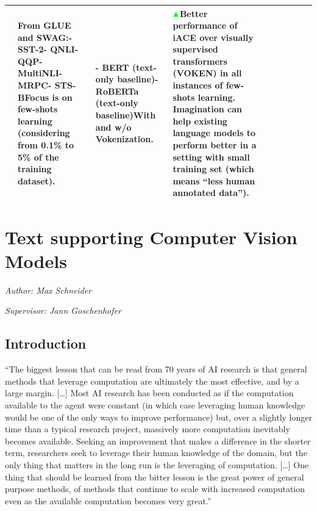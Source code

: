 \documentclass[
]{krantz}
\renewenvironment{quote}{\begin{VF}}{\end{VF}}
\begin{document}
\begin{longtable}[]{@{}llllllllll@{}}
\begin{minipage}[t]{0.25\columnwidth}
\end{minipage} & \begin{minipage}[t]{0.08\columnwidth}\raggedright
From GLUE and SWAG:- SST-2- QNLI- QQP- MultiNLI- MRPC- STS-BFocus is on few-shots learning (considering from 0.1\% to 5\% of the training dataset).\strut
\end{minipage} & \begin{minipage}[t]{0.05\columnwidth}\raggedright
- BERT (text-only baseline)- RoBERTa (text-only baseline)With and w/o Vokenization.\strut
\end{minipage} & \begin{minipage}[t]{0.13\columnwidth}\raggedright
\(\color{green}\blacktriangle\)Better performance of iACE over visually supervised transformers (VOKEN) in all instances of few-shots learning. Imagination can help existing language models to perform better in a setting with small training set (which means ``less human annotated data'').\strut
\end{minipage}\tabularnewline
\bottomrule
\end{longtable}

\hypertarget{c02-04-text-support-img}{%
\section{Text supporting Computer Vision Models}\label{c02-04-text-support-img}}

\emph{Author: Max Schneider}

\emph{Supervisor: Jann Goschenhofer}

\hypertarget{introduction-2}{%
\subsection{Introduction}\label{introduction-2}}

\begin{quote}
``The biggest lesson that can be read from 70 years of AI research is that general methods that leverage computation are ultimately the most effective, and by a large margin.
{[}\ldots{]} Most AI research has been conducted as if the computation available to the agent were constant (in which case leveraging human knowledge would be one of the only ways to improve performance) but, over a slightly longer time than a typical research project, massively more computation inevitably becomes available.
Seeking an improvement that makes a difference in the shorter term, researchers seek to leverage their human knowledge of the domain, but the only thing that matters in the long run is the leveraging of computation.
{[}\ldots{]} One thing that should be learned from the bitter lesson is the great power of general purpose methods, of methods that continue to scale with increased computation even as the available computation becomes very great.''

\end{quote}
\end{document}
